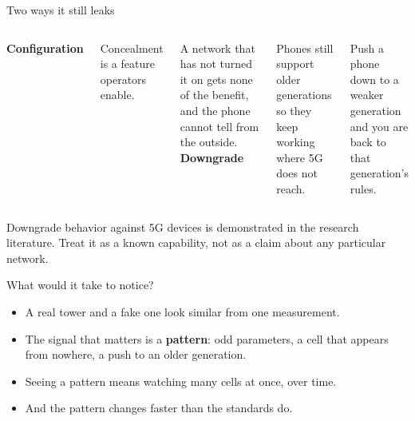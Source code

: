 \begin{frame}{Two ways it still leaks}
  \vspace{0.4em}
  \begin{columns}[T,onlytextwidth]
      \large\textbf{\textcolor{coreorange}{Configuration}}

      \vspace{0.5em}
      \small
      Concealment is a feature operators enable.

      \vspace{0.5em}
      A network that has not turned it on gets none of the benefit, and
      the phone cannot tell from the outside.
      \large\textbf{\textcolor{coreorange}{Downgrade}}

      \vspace{0.5em}
      \small
      Phones still support older generations so they keep working
      where 5G does not reach.

      \vspace{0.5em}
      Push a phone down to a weaker generation and you are back to that
      generation's rules.
  \end{columns}

  \vspace{0.8em}

  \vspace{0.3em}
  {\scriptsize\textcolor{softgray}{Downgrade behavior against 5G devices is
   demonstrated in the research literature. Treat it as a known capability,
   not as a claim about any particular network.}\par}
\end{frame}

\begin{frame}{What would it take to notice?}
  \vspace{0.4em}
  \small
  \begin{itemize}\itemsep6pt
    \item A real tower and a fake one look similar from one measurement.
    \item The signal that matters is a \textbf{pattern}: odd parameters, a
      cell that appears from nowhere, a push to an older generation.
    \item Seeing a pattern means watching many cells at once, over time.
    \item And the pattern changes faster than the standards do.
  \end{itemize}

  \vspace{0.8em}

\end{frame}

